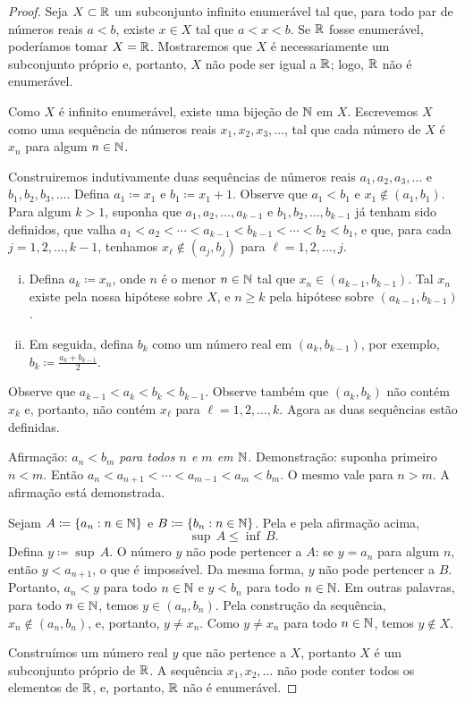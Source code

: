 \begin{proof}
Seja $X \subset {\mathbb{R}}$ um subconjunto infinito enumerável
tal que, para todo par de números reais
$a < b$, existe $x \in X$ tal que $a < x < b$. Se ${\mathbb{R}}$ fosse enumerável,
poderíamos tomar $X = {\mathbb{R}}$. Mostraremos que $X$ é necessariamente
um subconjunto próprio e, portanto, $X$ não pode ser igual a ${\mathbb{R}}$; logo, ${\mathbb{R}}$ não é
enumerável.

Como $X$ é infinito enumerável,
existe uma bijeção de ${\mathbb{N}}$ em $X$. Escrevemos $X$ como
uma sequência de números reais $x_1, x_2, x_3,\ldots$, tal que
cada número de $X$
é $x_n$ para algum $n \in {\mathbb{N}}$.

Construiremos indutivamente
duas sequências de números reais $a_1,a_2,a_3,\ldots$ e
$b_1,b_2,b_3,\ldots$. Defina
$a_1 \coloneqq x_1$ e $b_1 \coloneqq x_1+1$.
Observe que $a_1 < b_1$ e
$x_1 \notin (a_1,b_1)$.
Para algum $k > 1$,
suponha que $a_1,a_2,\ldots,a_{k-1}$ e $b_1,b_2,\ldots,b_{k-1}$ já tenham sido
definidos,
que valha
$a_1 < a_2 < \cdots < a_{k-1} < b_{k-1} < \cdots < b_2 < b_1$,
e que, para
cada $j=1,2,\ldots,k-1$,
tenhamos $x_\ell \notin (a_{j},b_{j})$
para $\ell=1,2,\ldots,j$.
\begin{enumerate}[(i)]
\item Defina $a_k \coloneqq x_n$, onde $n$ é o menor $n \in {\mathbb{N}}$
tal que $x_n \in (a_{k-1},b_{k-1})$. Tal $x_n$ existe pela nossa
hipótese sobre $X$, e $n \geq k$ pela hipótese sobre $(a_{k-1},b_{k-1})$.
\item Em seguida, defina $b_k$ como um número real em $(a_{k},b_{k-1})$,
por exemplo, $b_k \coloneqq \frac{a_k+b_{k-1}}{2}$.
\end{enumerate}
Observe que %
$a_{k-1} < a_k < b_k < b_{k-1}$.
Observe também que $(a_{k},b_{k})$ não contém $x_k$ e, portanto,
não contém $x_{\ell}$ para $\ell=1,2,\ldots,k$.
Agora as duas sequências estão definidas.

Afirmação: \emph{$a_n < b_m$ para todos $n$ e $m$ em ${\mathbb{N}}$.} Demonstração: suponha primeiro
$n < m$. Então $a_n < a_{n+1} < \cdots < a_{m-1} < a_m < b_m$.
O mesmo vale para $n > m$. A afirmação está demonstrada.

Sejam $A \coloneqq \{ a_n : n \in {\mathbb{N}} \}$ e $B \coloneqq \{ b_n : n \in {\mathbb{N}} \}$.
Pela  e pela afirmação acima,
\begin{equation*}
\sup\, A \leq \inf\, B .
\end{equation*}
Defina $y \coloneqq \sup\, A$. O número $y$ não pode pertencer a $A$: se $y = a_n$
para algum $n$, então $y < a_{n+1}$, o que é impossível.
Da mesma forma, $y$ não pode pertencer a $B$. Portanto,
$a_n < y$ para todo $n\in {\mathbb{N}}$
e $y < b_n$ para todo $n\in {\mathbb{N}}$.
Em outras palavras, para todo $n \in {\mathbb{N}}$, temos $y \in (a_n,b_n)$.
Pela construção da sequência, $x_n \notin (a_n,b_n)$,
e, portanto, $y \neq x_n$. Como $y \neq x_n$ para todo $n \in {\mathbb{N}}$, temos $y
\notin X$.

Construímos um número real $y$ que não pertence a $X$, portanto $X$
é um subconjunto próprio de ${\mathbb{R}}$.
A sequência $x_1,x_2,\ldots$ não pode conter todos os elementos de ${\mathbb{R}}$,
e, portanto, ${\mathbb{R}}$ não é enumerável.
\end{proof}

